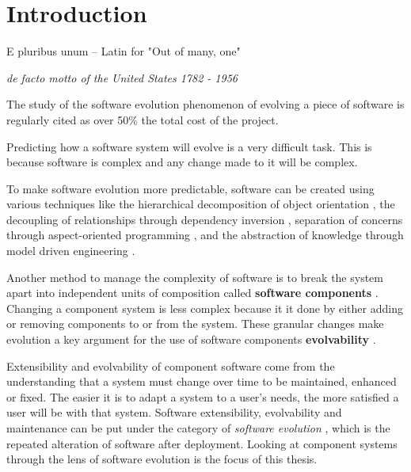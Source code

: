 \chapter{Introduction}
\label{introduction}
\epigraph{E pluribus unum -- Latin for "Out of many, one"}
{\textit{de facto motto of the United States 1782 - 1956}}
The study of the software evolution phenomenon of evolving a piece of software is regularly cited as over 50\% the total cost of the project.

Predicting how a software system will evolve is a very difficult task.
This is because software is complex and any change made to it will be complex.

To make software evolution more predictable, software can be created using various techniques like the hierarchical decomposition of object orientation \citep{goldberg1983smalltalk}, 
the decoupling of relationships through dependency inversion \citep{martin1996dependency}, 
separation of concerns through aspect-oriented programming \citep{Kiczales1997},
and the abstraction of knowledge through model driven engineering \citep{schmidt2006}.

Another method to manage the complexity of software is to break the system apart into independent units of composition called \textbf{software components} \citep{Szyperski2002}. 
Changing a component system is less complex because it it done by either adding or removing components to or from the system.
These granular changes make evolution  a key argument for the use of software components \textbf{evolvability} \citep{Szyperski2000}.

Extensibility and evolvability of component software come from the understanding that a system must change over time to be maintained, enhanced or fixed.
The easier it is to adapt a system to a user's needs, the more satisfied a user will be with that system.
Software extensibility, evolvability and maintenance can be put under the category of \textit{software evolution} \citep{lehman1980}, which is the repeated alteration of software after deployment.
Looking at component systems through the lens of software evolution is the focus of this thesis.

